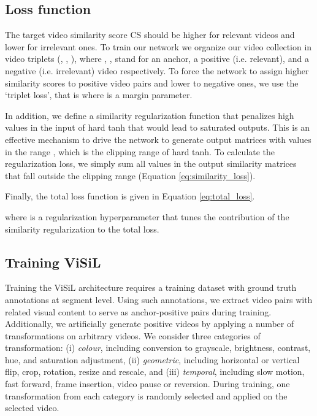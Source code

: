 \documentclass[10pt,twocolumn,letterpaper]{article}
\begin{document}
\subsection{Loss function}
\label{sec:loss_function}
The target video similarity score CS should be higher for relevant videos and lower for irrelevant ones. To train our network we organize our video collection in video triplets (, , ), where , ,  stand for an anchor, a positive (i.e. relevant), and a negative (i.e. irrelevant) video respectively. To force the network to assign higher similarity scores to positive video pairs and lower to negative ones, we use the `triplet loss', that is 
where  is a margin parameter. 



In addition, we define a similarity regularization function that penalizes high values in the input of hard tanh that would lead to saturated outputs. This is an effective mechanism to drive the network to generate output matrices  with values in the range , which is the clipping range of hard tanh. To calculate the regularization loss, we simply sum all values in the output similarity matrices that fall outside the clipping range (Equation \ref{eq:similarity_loss}).




Finally, the total loss function is given in Equation \ref{eq:total_loss}.

where  is a regularization hyperparameter that tunes the contribution of the similarity regularization to the total loss.




\subsection{Training ViSiL}
\label{sec:training_process}

Training the ViSiL architecture requires a training dataset with ground truth annotations at segment level. Using such annotations, we extract video pairs with related visual content to serve as anchor-positive pairs during training. Additionally, we artificially generate positive videos by applying a number of transformations on arbitrary videos. 
We consider three categories of transformation: (i) \textit{colour}, including conversion to grayscale, brightness, contrast, hue, and saturation adjustment, (ii) \textit{geometric}, including horizontal or vertical flip, crop, rotation, resize and rescale, and (iii) \textit{temporal}, including slow motion, fast forward, frame insertion, video pause or reversion. During training, one transformation from each category is randomly selected and applied on the selected video.
\end{document}
